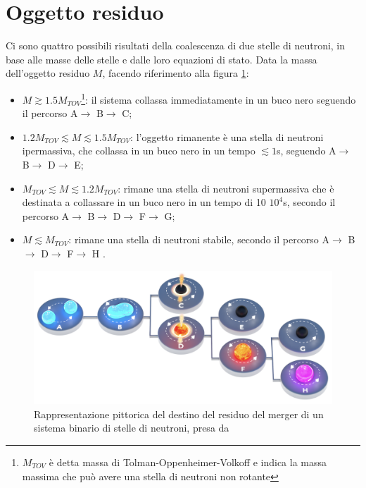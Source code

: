 \section{Oggetto residuo}
\label{section:residual}
Ci sono quattro possibili risultati della coalescenza di due stelle di neutroni, in base alle masse delle stelle e dalle loro equazioni di stato. 
Data la massa dell'oggetto residuo $M$, facendo riferimento alla figura \ref{fig:EvoluzioneBNS}:
\begin{itemize}
	\item $M\gtrsim 1.5 M_{TOV}$\footnote{$M_{TOV}$ è detta massa di Tolman-Oppenheimer-Volkoff e indica la massa massima che può avere una stella di neutroni non rotante}: il sistema collassa immediatamente in un buco nero seguendo il percorso A$\rightarrow$ B$\rightarrow$ C;
	\item $1.2 M_{TOV} \lesssim M \lesssim 1.5 M_{TOV}$: l'oggetto rimanente è una stella di neutroni ipermassiva, che collassa in un buco nero in un tempo $\lesssim 1$s, seguendo A$\rightarrow$ B$\rightarrow$ D$\rightarrow$ E;		
	\item $M_{TOV} \lesssim M \lesssim 1.2 M_{TOV}$: rimane una stella di neutroni supermassiva che è destinata a collassare in un buco nero in un tempo di 10 \textdiv $10^4$s, secondo il percorso A$\rightarrow$ B$\rightarrow$ D$\rightarrow$ F$\rightarrow$ G;		\item $M\lesssim M_{TOV}$: rimane una stella di neutroni stabile, secondo il percorso A$\rightarrow$ B$\rightarrow$ D$\rightarrow$ F$\rightarrow$ H \cite{sarin2020evolution}.	
\end{itemize}
\begin{center}
	\begin{figure}[ht]
		\centering
		\includegraphics[scale=0.25, angle=0]{figures/Capitolo_1/MagnetarEvolution.png}
		\setlength{\belowcaptionskip}{-20pt}
		\caption{Rappresentazione pittorica del destino del residuo del merger di un sistema binario di stelle di neutroni, presa da \cite{sarin2020evolution}}
		\label{fig:EvoluzioneBNS}
	\end{figure}
\end{center}

